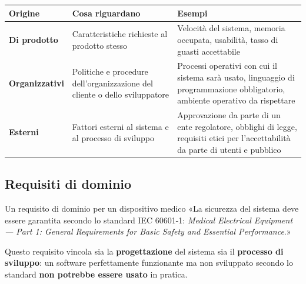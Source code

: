 \begin{table}[H]
\centering
\renewcommand{\arraystretch}{1.4}
\begin{tabularx}{\textwidth}{>{\bfseries}P{3.4cm} L L}
\toprule
Origine & Cosa riguardano & Esempi \\
\midrule
\textcolor{q3}{Di prodotto} & Caratteristiche richieste al prodotto stesso & Velocità del sistema, memoria occupata, usabilità, tasso di guasti accettabile \\
\textcolor{q7}{Organizzativi} & Politiche e procedure dell'organizzazione del cliente o dello sviluppatore & Processi operativi con cui il sistema sarà usato, linguaggio di programmazione obbligatorio, ambiente operativo da rispettare \\
\textcolor{q5}{Esterni} & Fattori esterni al sistema e al processo di sviluppo & Approvazione da parte di un ente regolatore, obblighi di legge, requisiti etici per l'accettabilità da parte di utenti e pubblico \\
\bottomrule
\end{tabularx}
\end{table}

\subsection{Requisiti di dominio}


\begin{esempio}{Un requisito di dominio per un dispositivo medico}
«La sicurezza del sistema deve essere garantita secondo lo standard IEC 60601-1: \textit{Medical Electrical Equipment --- Part 1:
General Requirements for Basic Safety and Essential Performance}.»

Questo requisito vincola sia la \textbf{progettazione} del sistema sia il \textbf{processo di sviluppo}: un software perfettamente
funzionante ma non sviluppato secondo lo standard \textbf{non potrebbe essere usato} in pratica.
\end{esempio}

